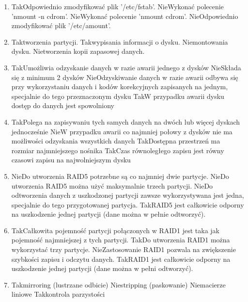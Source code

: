 \begin{enumerate}
		\newpage
		\item {}%
		{Tak}{Odpowiednio zmodyfikować plik '/etc/fstab'.}%
		{Nie}{Wykonać polecenie 'nmount -n cdrom'.}%
		{Nie}{Wykonać polecenie 'nmount cdrom'.}%
		{Nie}{Odpowiednio zmodyfikować plik '/etc/amount'.}
		\item {}%
		{Tak}{tworzenia partycji.}%
		{Tak}{wypisania informacji o dysku.}%
		{Nie}{montowania dysku.}%
		{Nie}{tworzenia kopii zapasowej danych.}
		\item {}%
		{Tak}{Umożliwia odzyskanie danych w razie awarii jednego z dysków}%
		{Nie}{Składa się z minimum 2 dysków}%
		{Nie}{Odzyskiwanie danych w razie awarii odbywa się przy wykorzystaniu danych i kodów korekcyjnych zapisanych na jednym, specjalnie do tego przeznaczonym dysku}%
		{Tak}{W przypadku awarii dysku dostęp do danych jest spowolniony}
		\item {}%
		{Tak}{Polega na zapisywaniu tych samych danych na dwóch lub więcej dyskach jednocześnie}%
		{Nie}{W przypadku awarii co najmniej połowy z dysków nie ma możliwości odzyskania wszystkich danych}%
		{Tak}{Dostępna przestrzeń ma rozmiar najmniejszego nośnika}%
		{Tak}{Czas równoległego zapisu jest równy czasowi zapisu na najwolniejszym dysku}
		\item {}%
		{Nie}{Do utworzenia RAID5 potrzebne są co najmniej dwie partycje.}%
		{Nie}{Do utworzenia RAID5 można użyć maksymalnie trzech partycji.}%
		{Nie}{Do odtworzenia danych z uszkodzonej partycji zawsze wykorzystywana jest jedna, specjalnie do tego przygotowanej partycja.}%
		{Tak}{RAID5 jest całkowicie odporny na uszkodzenie jednej partycji (dane można w pełnie odtworzyć).}
		\item {}%
		{Tak}{Całkowita pojemność partycji połączonych w RAID1 jest taka jak pojemność najmniejszej z tych partycji.}%
		{Tak}{Do utworzenia RAID1 można wykorzystać trzy partycje.}%
		{Nie}{Zastosowanie RAID1 pozwala na zwiększenie szybkości zapisu i odczytu danych.}%
		{Tak}{RAID1 jest całkowicie odporny na uszkodzenie jednej partycji (dane można w pełni odtworzyć).}
		\item {}%
		{Tak}{mirroring (lustrzane odbicie)}%
		{Nie}{stripping (paskowanie)}%
		{Nie}{macierze liniowe}%
		{Tak}{kontrola parzystości}
		

\end{enumerate}
